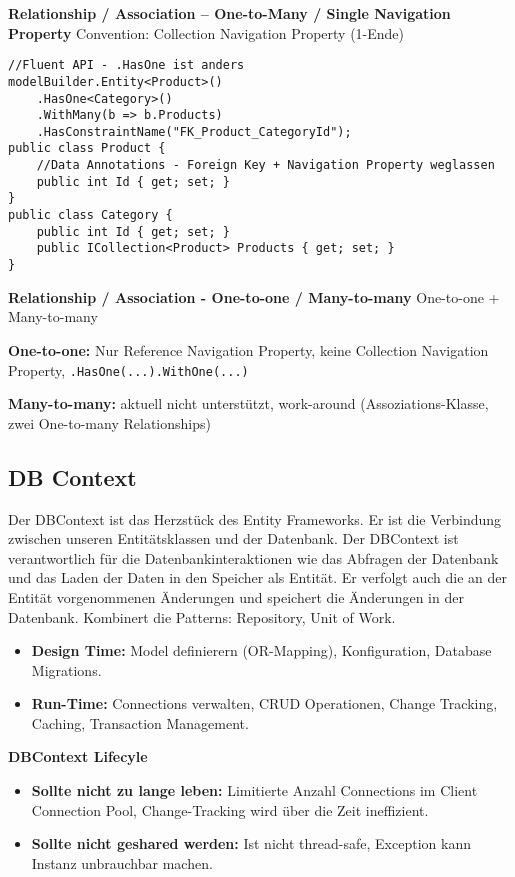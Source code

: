 \textbf{Relationship / Association – One-to-Many / Single Navigation Property} Convention: Collection Navigation Property (1-Ende)
\begin{lstlisting}
//Fluent API - .HasOne ist anders
modelBuilder.Entity<Product>()
    .HasOne<Category>()
    .WithMany(b => b.Products)
    .HasConstraintName("FK_Product_CategoryId");
public class Product {
    //Data Annotations - Foreign Key + Navigation Property weglassen
    public int Id { get; set; }                         
}
public class Category {
    public int Id { get; set; }
    public ICollection<Product> Products { get; set; }
}
\end{lstlisting}

\textbf{Relationship / Association - One-to-one / Many-to-many} One-to-one + Many-to-many

\textbf{One-to-one:} Nur Reference Navigation Property, keine Collection Navigation Property, \lstinline|.HasOne(...).WithOne(...)|

\textbf{Many-to-many:} aktuell nicht unterstützt, work-around (Assoziations-Klasse, zwei One-to-many Relationships)


\subsection{DB Context}
Der DBContext ist das Herzstück des Entity Frameworks. Er ist die Verbindung zwischen unseren Entitätsklassen und der Datenbank. Der DBContext ist verantwortlich für die Datenbankinteraktionen wie das Abfragen der Datenbank und das Laden der Daten in den Speicher als Entität. Er verfolgt auch die an der Entität vorgenommenen Änderungen und speichert die Änderungen in der Datenbank. Kombinert die Patterns: Repository, Unit of Work.

\begin{itemize}
	\item \textbf{Design Time:} Model definierern (OR-Mapping), Konfiguration, Database Migrations.
	\item \textbf{Run-Time:} Connections verwalten, CRUD Operationen, Change Tracking, Caching, Transaction Management.
\end{itemize}

\textbf{DBContext Lifecyle}
\begin{itemize}
	\item \textbf{Sollte nicht zu lange leben:} Limitierte Anzahl Connections im Client Connection Pool, Change-Tracking wird über die Zeit ineffizient.
	\item \textbf{Sollte nicht geshared werden:} Ist nicht thread-safe, Exception kann Instanz unbrauchbar machen.
\end{itemize}

